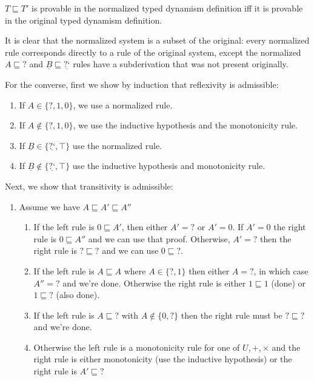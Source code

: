 \documentclass[acmsmall,nonacm]{acmart}
\renewcommand{\u}{\underline}
\newcommand{\ltdyn}{\sqsubseteq}
\newcommand{\dynv}{{?}}
\newcommand{\dync}{\u {\text{?`}}}
\begin{document}
\begin{longonly}
\begin{lemma}
  \label{lem:norm-type-dyn}
  $T \ltdyn T'$ is provable in the normalized typed dynamism
  definition iff it is provable in the original typed
  dynamism definition.
\end{lemma}
\begin{longproof}
It is clear that the normalized system is a subset of the original:
every normalized rule corresponds directly to a rule of the original
system, except the normalized $A \ltdyn \dynv$ and $\u B \ltdyn \dync$
rules have a subderivation that was not present originally.  

For the converse, first we show by induction that reflexivity is
admissible:
  \begin{enumerate}
  \item If $A \in \{\dynv, 1, 0\}$, we use a normalized rule.
  \item If $A \not\in\{\dynv, 1, 0\}$, we use the inductive hypothesis
    and the monotonicity rule.
  \item If $\u B\in \{\dync, \top\}$ use the normalized rule.
  \item If $\u B \not\in\{\dync, \top\}$ use the inductive hypothesis
    and monotonicity rule.
  \end{enumerate}
  Next, we show that transitivity is admissible:
  \begin{enumerate}
  \item Assume we have $A \ltdyn A' \ltdyn A''$
    \begin{enumerate}
    \item If the left rule is $0 \ltdyn A'$, then either $A' = \dynv$
      or $A' = 0$. If $A' = 0$ the right rule is $0 \ltdyn A''$ and we
      can use that proof. Otherwise, $A' = \dynv$ then the right rule
      is $\dynv \ltdyn \dynv$ and we can use $0 \ltdyn \dynv$.
    \item If the left rule is $A \ltdyn A$ where $A \in \{ \dynv, 1\}$
      then either $A = \dynv$, in which case $A'' = \dynv$ and we're
      done.  Otherwise the right rule is either $1 \ltdyn 1$ (done) or
      $1 \ltdyn \dynv$ (also done).
    \item If the left rule is $A \ltdyn \dynv$ with
      $A\not\in\{0,\dynv\}$ then the right rule must be $\dynv \ltdyn
      \dynv$ and we're done.
    \item Otherwise the left rule is a monotonicity rule for one of
      $U, +, \times$ and the right rule is either monotonicity (use
      the inductive hypothesis) or the right rule is $A' \ltdyn \dynv$

\end{enumerate}
\end{enumerate}
\end{longproof}
\end{longonly}
\end{document}
